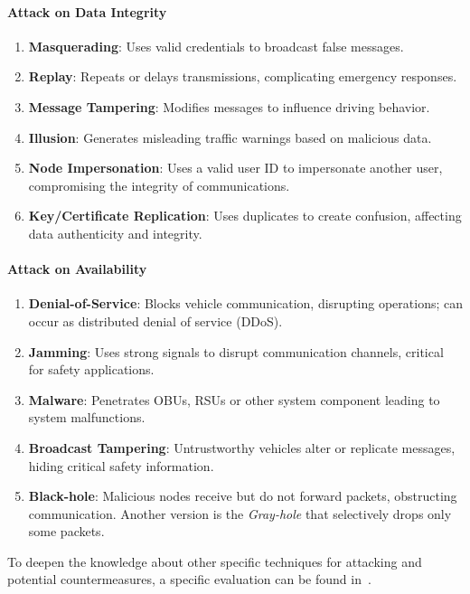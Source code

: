 \paragraph{Attack on Data Integrity}
\begin{enumerate}
    \item \textbf{Masquerading}: Uses valid credentials to broadcast false messages.
    \item \textbf{Replay}: Repeats or delays transmissions, complicating emergency responses.
    \item \textbf{Message Tampering}: Modifies messages to influence driving behavior.
    \item \textbf{Illusion}: Generates misleading traffic warnings based on malicious data.
    \item \textbf{Node Impersonation}: Uses a valid user ID to impersonate another user, compromising the integrity of communications.
    \item \textbf{Key/Certificate Replication}: Uses duplicates to create confusion, affecting data authenticity and integrity.
\end{enumerate}

\paragraph{Attack on Availability}
\begin{enumerate}
    \item \textbf{Denial-of-Service}: Blocks vehicle communication, disrupting operations; can occur as distributed denial of service (DDoS)\cite{sontakke2022impact}.
    \item \textbf{Jamming}: Uses strong signals to disrupt communication channels, critical for safety applications.
    \item \textbf{Malware}: Penetrates OBUs, RSUs or other system component leading to system malfunctions.
    \item \textbf{Broadcast Tampering}: Untrustworthy vehicles alter or replicate messages, hiding critical safety information.
    \item \textbf{Black-hole}: Malicious nodes receive but do not forward packets, obstructing communication.
    Another version is the \textit{Gray-hole} that selectively drops only some packets.
\end{enumerate}


To deepen the knowledge about other specific techniques for attacking and potential countermeasures, a specific evaluation
can be found in~\cite{simulation-attacks-vanets, sheikh2019comprehensive, macena2023cybersecurity}.

